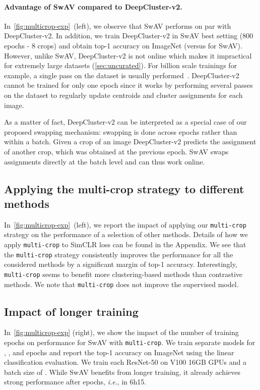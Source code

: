 \documentclass{article}
\def\onedot{.}
\def\ie{\emph{i.e}\onedot} \def\Ie{\emph{I.e}\onedot}
\def\OURS{SwAV\xspace}
\newcommand{\appendixName}{Appendix}
\begin{document}
\paragraph{Advantage of \OURS compared to DeepCluster-v2.}
In~\cref{fig:multicrop-exp}~(left), we observe that \OURS performs on par with DeepCluster-v2.
In addition, we train DeepCluster-v2 in SwAV best setting (800 epochs - 8 crops) and obtain  top-1 accuracy on ImageNet (versus  for \OURS).
However, unlike \OURS, DeepCluster-v2 is not online which makes it impractical for extremely large datasets (\cref{sec:uncurated}).
For billion scale trainings for example, a single pass on the dataset is usually performed~\cite{he2019momentum}.
DeepCluster-v2 cannot be trained for only one epoch since it works by performing several passes on the dataset to regularly update centroids and cluster assignments for each image.

As a matter of fact, DeepCluster-v2 can be interpreted as a special case of our proposed swapping mechanism: swapping is done across epochs rather than within a batch.
Given a crop of an image DeepCluster-v2 predicts the assignment of another crop, which was obtained at the previous epoch.
\OURS swaps assignments directly at the batch level and can thus work online.

\subsection{Applying the multi-crop strategy to different methods}
In~\cref{fig:multicrop-exp}~(left), we report the impact of applying our \texttt{multi-crop} strategy on the performance of a selection of other methods.
Details of how we apply \texttt{multi-crop} to SimCLR loss can be found in the \appendixName.
We see that the \texttt{multi-crop} strategy consistently improves the performance for all the considered methods by a significant margin of  top-1 accuracy.
Interestingly, \texttt{multi-crop} seems to benefit more clustering-based methods than contrastive methods.
We note that \texttt{multi-crop} does not improve the supervised model.


\subsection{Impact of longer training}
In~\cref{fig:multicrop-exp} (right), we show the impact of the number of training epochs on performance for \OURS with \texttt{multi-crop}.
We train separate models for , ,  and  epochs and report the top-1 accuracy on ImageNet using the linear classification evaluation.
We train each ResNet-50 on  V100 16GB GPUs and a batch size of .
While \OURS benefits from longer training, it already achieves strong performance after  epochs, \ie,  in 6h15.
\end{document}
